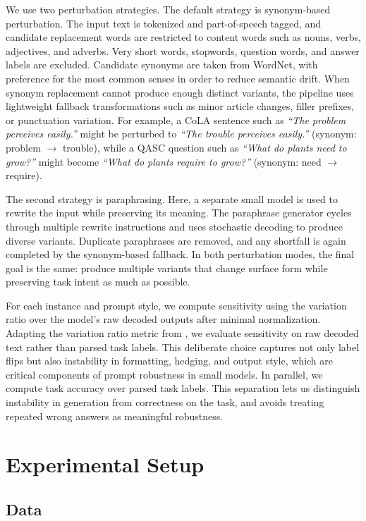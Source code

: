 \documentclass[11pt]{article}
\begin{document}
We use two perturbation strategies. The default strategy is synonym-based perturbation. The input text is tokenized and part-of-speech tagged, and candidate replacement words are restricted to content words such as nouns, verbs, adjectives, and adverbs. Very short words, stopwords, question words, and answer labels are excluded. Candidate synonyms are taken from WordNet, with preference for the most common senses in order to reduce semantic drift. When synonym replacement cannot produce enough distinct variants, the pipeline uses lightweight fallback transformations such as minor article changes, filler prefixes, or punctuation variation. For example, a CoLA sentence such as \textit{``The problem perceives easily.''} might be perturbed to \textit{``The trouble perceives easily.''} (synonym: problem $\rightarrow$ trouble), while a QASC question such as \textit{``What do plants need to grow?''} might become \textit{``What do plants require to grow?''} (synonym: need $\rightarrow$ require).

The second strategy is paraphrasing. Here, a separate small model is used to rewrite the input while preserving its meaning. The paraphrase generator cycles through multiple rewrite instructions and uses stochastic decoding to produce diverse variants. Duplicate paraphrases are removed, and any shortfall is again completed by the synonym-based fallback. In both perturbation modes, the final goal is the same: produce multiple variants that change surface form while preserving task intent as much as possible.

For each instance and prompt style, we compute sensitivity using the variation ratio over the model's raw decoded outputs after minimal normalization. Adapting the variation ratio metric from \citet{lu-etal-2024-prompts}, we evaluate sensitivity on raw decoded text rather than parsed task labels. This deliberate choice captures not only label flips but also instability in formatting, hedging, and output style, which are critical components of prompt robustness in small models. In parallel, we compute task accuracy over parsed task labels. This separation lets us distinguish instability in generation from correctness on the task, and avoids treating repeated wrong answers as meaningful robustness.

\section{Experimental Setup}

\subsection{Data}
\end{document}
